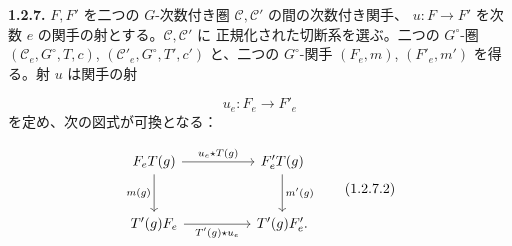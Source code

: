 \noindent\textbf{1.2.7.}\quad
$F,F'$ を二つの $G$-次数付き圏 $\mathcal C,\mathcal C'$ の間の次数付き関手、
$u\colon F\to F'$ を次数 $e$ の関手の射とする。$\mathcal C,\mathcal C'$ に
正規化された切断系を選ぶ。二つの $G^\circ$-圏
$(\mathcal C_e,G^\circ,T,c)$, $(\mathcal C'_e,G^\circ,T',c')$ と、二つの
$G^\circ$-関手 $(F_e,m)$, $(F'_e,m')$ を得る。射 $u$ は関手の射

\begin{equation}
  u_e\colon F_e\longrightarrow F'_e
  \tag{1.2.7.1}
\end{equation}
を定め、次の図式が可換となる：

\begin{equation}
\begin{tikzcd}[column sep=huge,row sep=large]
F_eT(g)
  \arrow[r,"u_e\star T(g)"]
  \arrow[d,"m(g)",swap]
&
F_e^{\prime}T(g)
  \arrow[d,"m^{\prime}(g)"]
\\
T^{\prime}(g)F_e
  \arrow[r,"T^{\prime}(g)\star u_e",swap]
&
T^{\prime}(g)F_e^{\prime}\mathpunct{.}
\end{tikzcd}
\tag{1.2.7.2}
\end{equation}
